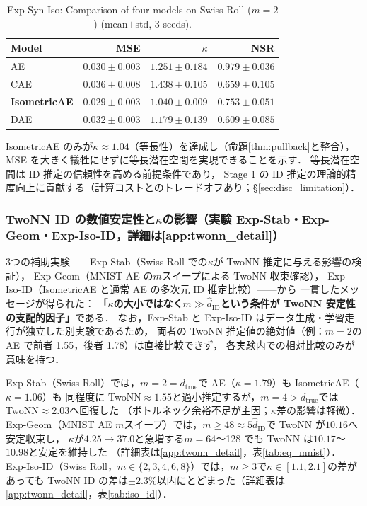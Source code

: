 \documentclass[11pt,a4paper]{jsarticle}
\newcommand{\kap}{\kappa}
\begin{document}
\begin{table}[H]
\centering
\caption{Exp-Syn-Iso: Comparison of four models on Swiss Roll ($m=2$) (mean$\pm$std, 3 seeds).}
\label{tab:ec}
\small
\begin{tabular}{lrrr}
\toprule
Model & MSE & $\kap$ & NSR \\
\midrule
AE & $0.030\pm0.003$ & $1.251\pm0.184$ & $0.979\pm0.036$ \\
CAE & $0.036\pm0.008$ & $1.438\pm0.105$ & $0.659\pm0.105$ \\
\textbf{IsometricAE} & $\boldsymbol{0.029\pm0.003}$ & $\boldsymbol{1.040\pm0.009}$ & $0.753\pm0.051$ \\
DAE & $0.032\pm0.003$ & $1.179\pm0.139$ & $0.609\pm0.085$ \\
\bottomrule
\end{tabular}
\end{table}

IsometricAE のみが$\kap \approx 1.04$（等長性）を達成し（命題\ref{thm:pullback}と整合），
MSE を大きく犠牲にせずに等長潜在空間を実現できることを示す．
等長潜在空間は ID 推定の信頼性を高める前提条件であり，
Stage 1 の ID 推定の理論的精度向上に貢献する（計算コストとのトレードオフあり；§\ref{sec:disc_limitation}）．

\subsubsection{TwoNN ID の数値安定性と$\kap$の影響（実験 Exp-Stab・Exp-Geom・Exp-Iso-ID，詳細は\ref{app:twonn_detail}）}\label{sec:exp_ep}

3つの補助実験——Exp-Stab（Swiss Roll での$\kap$が TwoNN 推定に与える影響の検証），
Exp-Geom（MNIST AE の$m$スイープによる TwoNN 収束確認），
Exp-Iso-ID（IsometricAE と通常 AE の多次元 ID 推定比較）——から
一貫したメッセージが得られた：
\textbf{「$\kap$の大小ではなく$m \gg \hat{d}_\mathrm{ID}$という条件が TwoNN 安定性の支配的因子」}である．
なお，Exp-Stab と Exp-Iso-ID はデータ生成・学習走行が独立した別実験であるため，
両者の TwoNN 推定値の絶対値（例：$m=2$の AE で前者 1.55，後者 1.78）は直接比較できず，
各実験内での相対比較のみが意味を持つ．

Exp-Stab（Swiss Roll）では，$m=2=d_\mathrm{true}$で AE（$\kap=1.79$）も IsometricAE（$\kap=1.06$）も
同程度に TwoNN$\approx1.55$と過小推定するが，$m=4>d_\mathrm{true}$では TwoNN$\approx2.03$へ回復した
（ボトルネック余裕不足が主因；$\kap$差の影響は軽微）．
Exp-Geom（MNIST AE $m$スイープ）では，$m \geq 48 \approx 5\hat{d}_\mathrm{ID}$で TwoNN が$10.16$へ安定収束し，
$\kap$が$4.25 \to 37.0$と急増する$m=64$〜128 でも TwoNN は$10.17$〜$10.98$と安定を維持した
（詳細表は\ref{app:twonn_detail}，表\ref{tab:eq_mnist}）．
Exp-Iso-ID（Swiss Roll，$m \in \{2,3,4,6,8\}$）では，$m \geq 3$で$\kap \in [1.1, 2.1]$の差があっても
TwoNN ID の差は$\pm2.3\%$以内にとどまった（詳細表は\ref{app:twonn_detail}，表\ref{tab:iso_id}）．
\end{document}
